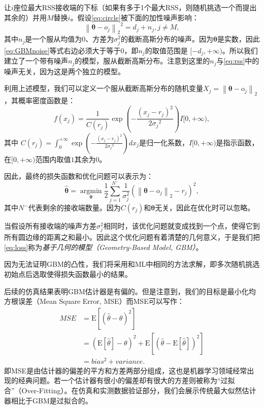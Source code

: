 让$i$座位最大RSS接收端的下标（如果有多于1个最大RSS，则随机挑选一个而提出其余的）并用$M$替换$i$。假设\eqref{eq:circle}被下面的加性噪声影响：
\begin{equation}
{\left\| {\bm{\theta}  - o_j} \right\|_2}^2 = d_j + n_j, j \neq M, \label{eq:GBMnoise}
\end{equation}
其中$n_j$是一个服从均值为$0$、方差为$\sigma_j^2$的截断高斯分布的噪声。因为$\bm{\theta}$是实数，因此\eqref{eq:GBMnoise}等式右边必须大于等于$0$，即$n_j$的取值范围是 $[-d_j, +\infty)$。所以我们建立了一个带有噪声$n_j$的模型，服从截断高斯分布。注意到这里的$n_j$与\eqref{eq:rss}中的噪声无关，因为这是两个独立的模型。

利用上述模型，我们可以定义一个服从截断高斯分布的随机变量$X_j = \left\|{\bm\theta} - \bm{\mathrm{o}}_j\right\|_2$，其概率密度函数是：
\begin{equation}
f(x_j) = \frac{1}{C(r_j)}\exp(-\frac{(x_j - r_j)^2}{2{\sigma_j}^2})I[0, +\infty), \label{eq:pdf}
\end{equation}
其中 $C(r_j) = \int_0^{ + \infty }\exp(-\frac{(x_j - r_j)^2}{2{\sigma_j}^2})dx_j$是归一化系数，$I[0, +\infty)$是指示函数，在$[0, +\infty)$范围内取值$1$其余为$0$。

因此，最终的损失函数和优化问题可以表示为：
\begin{equation}
\widehat {\bm{\theta }} = \mathop {\arg \min }\limits_{\bm{\theta }} \frac{1}{2}\sum\limits_{j = 1}^{N^-} {\frac{1}{\sigma_j^2}(\left\|{\bm\theta} - \bm{\mathrm{o}}_j\right\|_2 - r_j)^2}, \label{eq:loss}
\end{equation}
其中$N^-$代表剩余的接收端数量。因为$C(r_j)$和$\bm\theta$无关，因此在优化时可以忽略。

当假设所有接收端的噪声方差$\sigma_j^2$相同时，该优化问题就变成找到一个点，使得它到所有圆边缘的距离之和最小。因此这个优化问题有着清楚的几何意义，于是我们把\eqref{eq:loss}称为\textit{基于几何的模型（Geometry-Based Model, GBM）}。

因为无法证明GBM的凸性，我们将采用和ML中相同的方法求解，即多次随机挑选初始点后选取使得损失函数最小的结果。

后续的仿真结果表明GBM估计器是有偏的。但是注意到，我们的目标是最小化均方根误差（Mean Square Error, MSE）而MSE可以写作：
\begin{equation}    \label{eq:mse}
\begin{split}
MSE &= \mathrm{E}[(\widehat{\theta} - \theta)^2]\\
&= (\mathrm{E}[\widehat{\theta}] - \theta)^2 + \mathrm{E}[(\widehat{\theta} - \mathrm{E}[\widehat{\theta}])^2]\\
&= bias^2 + variance.
\end{split}
\end{equation}
即MSE是由估计器的偏差的平方和方差两部分组成，这也是机器学习领域经常出现的经典问题。若一个估计器有很小的偏差却有很大的方差则被称为“过拟合”（Over-Fitting）。在仿真和实测数据验证部分，我们会展示传统最大似然估计器相比于GBM是过拟合的。

